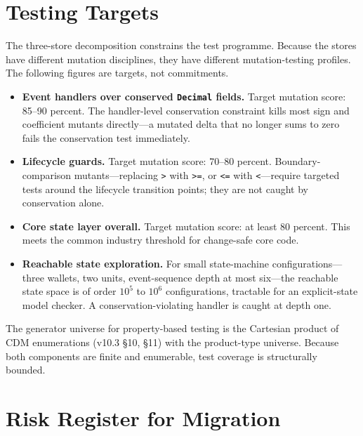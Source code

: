 \documentclass[11pt,a4paper]{article}
\begin{document}
\clearpage
\section{Testing Targets}
\label{sec:testing}

The three-store decomposition constrains the test programme. Because the stores have different mutation disciplines, they have different mutation-testing profiles. The following figures are targets, not commitments.

\begin{itemize}[leftmargin=*]
\item \textbf{Event handlers over conserved \texttt{Decimal} fields.} Target mutation score: 85--90 percent. The handler-level conservation constraint kills most sign and coefficient mutants directly---a mutated delta that no longer sums to zero fails the conservation test immediately.
\item \textbf{Lifecycle guards.} Target mutation score: 70--80 percent. Boundary-comparison mutants---replacing \texttt{>} with \texttt{>=}, or \texttt{<=} with \texttt{<}---require targeted tests around the lifecycle transition points; they are not caught by conservation alone.
\item \textbf{Core state layer overall.} Target mutation score: at least 80 percent. This meets the common industry threshold for change-safe core code.
\item \textbf{Reachable state exploration.} For small state-machine configurations---three wallets, two units, event-sequence depth at most six---the reachable state space is of order $10^5$ to $10^6$ configurations, tractable for an explicit-state model checker. A conservation-violating handler is caught at depth one.
\end{itemize}

\noindent The generator universe for property-based testing is the Cartesian product of CDM enumerations (v10.3 \S 10, \S 11) with the product-type universe. Because both components are finite and enumerable, test coverage is structurally bounded.

\clearpage
\section{Risk Register for Migration}
\label{sec:risk}
\end{document}
